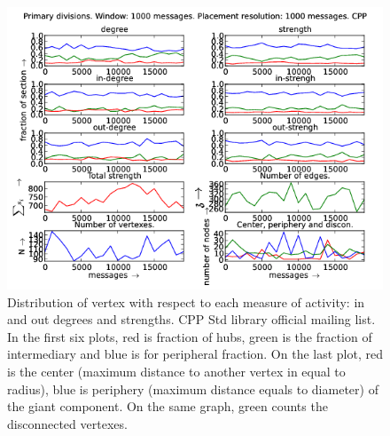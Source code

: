 \documentclass[%
 aip,
 jmp,%
 amsmath,amssymb,
 reprint,%
]{revtex4-1}
\begin{document}
\begin{figure}[hbtp] 
   \centering
        \includegraphics[width=\textwidth]{figs/CPP/1000}
    \caption{Distribution of vertex with respect to each measure of activity: in and out degrees and strengths. CPP Std library official mailing list. In the first six plots, red is fraction of hubs, green is the fraction of intermediary and blue is for peripheral fraction. On the last plot, red is the center (maximum distance to another vertex in equal to radius), blue is periphery (maximum distance equals to diameter) of the giant component. On the same graph, green counts the disconnected vertexes.}
    \label{fig:cpp1000}
\end{figure}
\end{document}
